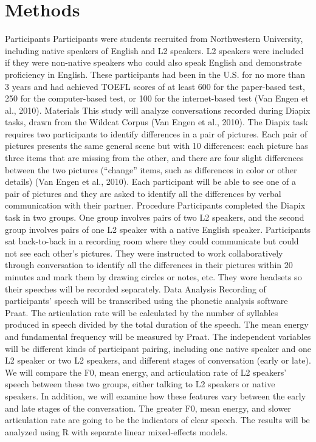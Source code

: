 \documentclass[
  man,
  floatsintext,
  longtable,
  nolmodern,
  notxfonts,
  notimes,
  colorlinks=true,linkcolor=blue,citecolor=blue,urlcolor=blue]{apa7}
\begin{document}
\section{Methods}\label{methods}

Participants Participants were students recruited from Northwestern
University, including native speakers of English and L2 speakers. L2
speakers were included if they were non-native speakers who could also
speak English and demonstrate proficiency in English. These participants
had been in the U.S. for no more than 3 years and had achieved TOEFL
scores of at least 600 for the paper-based test, 250 for the
computer-based test, or 100 for the internet-based test (Van Engen et
al., 2010). Materials This study will analyze conversations recorded
during Diapix tasks, drawn from the Wildcat Corpus (Van Engen et al.,
2010). The Diapix task requires two participants to identify differences
in a pair of pictures. Each pair of pictures presents the same general
scene but with 10 differences: each picture has three items that are
missing from the other, and there are four slight differences between
the two pictures (``change'' items, such as differences in color or
other details) (Van Engen et al., 2010). Each participant will be able
to see one of a pair of pictures and they are asked to identify all the
differences by verbal communication with their partner. Procedure
Participants completed the Diapix task in two groups. One group involves
pairs of two L2 speakers, and the second group involves pairs of one L2
speaker with a native English speaker. Participants sat back-to-back in
a recording room where they could communicate but could not see each
other's pictures. They were instructed to work collaboratively through
conversation to identify all the differences in their pictures within 20
minutes and mark them by drawing circles or notes, etc. They wore
headsets so their speeches will be recorded separately. Data Analysis
Recording of participants' speech will be transcribed using the phonetic
analysis software Praat. The articulation rate will be calculated by the
number of syllables produced in speech divided by the total duration of
the speech. The mean energy and fundamental frequency will be measured
by Praat. The independent variables will be different kinds of
participant pairing, including one native speaker and one L2 speaker or
two L2 speakers, and different stages of conversation (early or late).
We will compare the F0, mean energy, and articulation rate of L2
speakers' speech between these two groups, either talking to L2 speakers
or native speakers. In addition, we will examine how these features vary
between the early and late stages of the conversation. The greater F0,
mean energy, and slower articulation rate are going to be the indicators
of clear speech. The results will be analyzed using R with separate
linear mixed-effects models.
\end{document}
